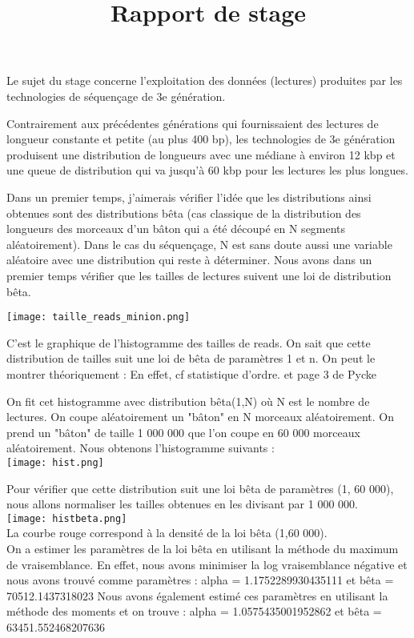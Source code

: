 \documentclass[12pt]{article}
\begin{document}
\title{Rapport de stage}
\maketitle


Le  sujet du stage concerne l'exploitation des données (lectures)
produites par les technologies de séquençage de 3e génération.

Contrairement aux précédentes générations qui fournissaient des lectures
de longueur constante et petite (au plus 400 bp), les technologies de 3e
génération produisent une distribution de longueurs avec une médiane à
environ 12 kbp et une queue de distribution qui va jusqu'à 60 kbp pour les
lectures les plus longues.

Dans un premier temps, j'aimerais vérifier l'idée que les distributions ainsi obtenues sont des distributions bêta (cas classique de la distribution
des longueurs des morceaux d'un bâton qui a été découpé en N segments
aléatoirement). Dans le cas du séquençage, N est sans doute aussi une
variable aléatoire avec une distribution qui reste à déterminer.
Nous avons dans un premier temps vérifier que les tailles de lectures suivent une loi de distribution bêta.

\texttt{[image: taille\_reads\_minion.png]} 

C'est le graphique de l'histogramme des tailles de reads.
On sait que cette distribution de tailles suit une loi de bêta de paramètres 1 et n.
On peut le montrer théoriquement :
En effet, cf statistique d'ordre. et page 3 de Pycke

On fit cet histogramme avec distribution bêta(1,N) où N est le nombre de lectures.
On coupe aléatoirement un "bâton" en N morceaux aléatoirement.
On prend un "bâton" de taille 1 000 000 que l'on coupe en 60 000 morceaux aléatoirement. Nous obtenons l'histogramme suivants : \\
\texttt{[image: hist.png]}

Pour vérifier que cette distribution suit une loi bêta de paramètres (1, 60 000), nous allons normaliser les tailles obtenues en les divisant par 1 000 000.\\
\texttt{[image: histbeta.png]}\\
La courbe rouge correspond à la densité de la loi bêta (1,60 000).\\
On a estimer les paramètres de la loi bêta en utilisant la méthode du maximum de vraisemblance. En effet, nous avons minimiser la log vraisemblance négative et nous avons trouvé comme paramètres : 
alpha = 1.1752289930435111 et bêta = 70512.1437318023
Nous avons également estimé ces paramètres en utilisant la méthode des moments et on trouve : 
alpha = 1.0575435001952862 et bêta = 63451.552468207636
\end{document}
